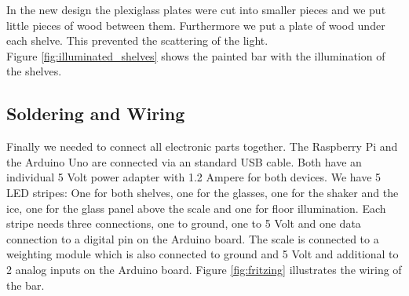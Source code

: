\documentclass{acm_proc_article-sp}
\begin{document}
\begin{minipage}{\linewidth}%
\label{fig:illuminated_shelves}%
\end{minipage}


In the new design the plexiglass plates were cut into smaller pieces and we put little pieces of wood between them. Furthermore we put a plate of wood under each shelve. This prevented the scattering of the light.\\
Figure \ref{fig:illuminated_shelves} shows the painted bar with the illumination of the shelves.

\subsection{Soldering and Wiring}
Finally we needed to connect all electronic parts together. The Raspberry Pi and the Arduino Uno are connected via an standard USB cable. Both have an individual 5 Volt power adapter with 1.2 Ampere for both devices. We have 5 LED stripes: One for both shelves, one for the glasses, one for the shaker and the ice, one for the glass panel above the scale and one for floor illumination. Each stripe needs three connections, one to ground, one to 5 Volt and one data connection to a digital pin on the Arduino board. The scale is connected to a weighting module which is also connected to ground and 5 Volt and additional to 2 analog inputs on the Arduino board.
Figure \ref{fig:fritzing} illustrates the wiring of the bar.
\end{document}
